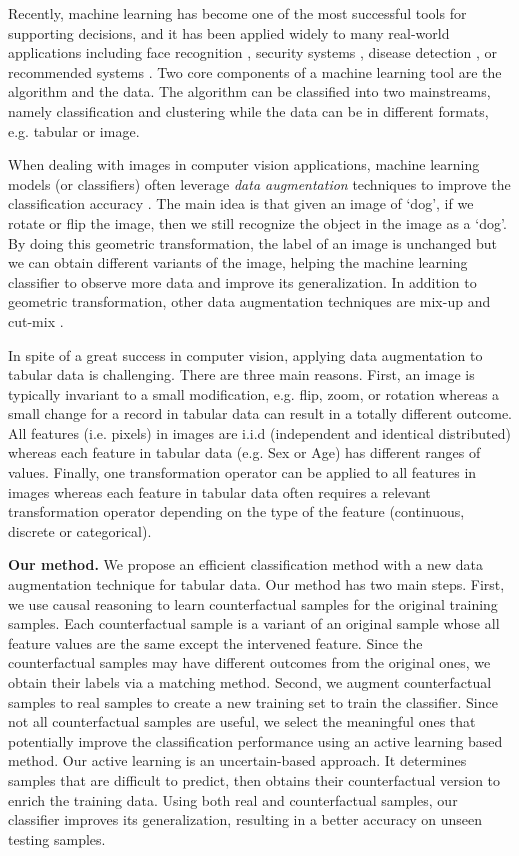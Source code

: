 Recently, machine learning has become one of the most successful tools
for supporting decisions, and it has been applied widely to many real-world
applications including face recognition \cite{sharif2016accessorize},
security systems \cite{apruzzese2019addressing}, disease detection
\cite{kumar2016dermatological}, or recommended systems \cite{portugal2018use}.
Two core components of a machine learning tool are the algorithm and
the data. The algorithm can be classified into two mainstreams, namely
classification and clustering while the data can be in different formats,
e.g. tabular or image.

When dealing with images in computer vision applications, machine
learning models (or classifiers) often leverage \textit{data augmentation}
techniques to improve the classification accuracy \cite{fawaz2018data}.
The main idea is that given an image of `dog', if we rotate or flip
the image, then we still recognize the object in the image as a `dog'.
By doing this geometric transformation, the label of an image is unchanged
but we can obtain different variants of the image, helping the machine
learning classifier to observe more data and improve its generalization.
In addition to geometric transformation, other data augmentation techniques
are mix-up \cite{zhang2017mixup} and cut-mix \cite{walawalkar2020attentive}.

In spite of a great success in computer vision, applying data augmentation
to tabular data is challenging. There are three main reasons. First,
an image is typically invariant to a small modification, e.g. flip,
zoom, or rotation whereas a small change for a record in tabular data
can result in a totally different outcome. All features (i.e. pixels)
in images are i.i.d (independent and identical distributed) whereas
each feature in tabular data (e.g. Sex or Age) has different ranges
of values. Finally, one transformation operator can be applied to
all features in images whereas each feature in tabular data often
requires a relevant transformation operator depending on the type
of the feature (continuous, discrete or categorical).

\textbf{Our method.} We propose an efficient classification method
with a new data augmentation technique for tabular data. Our method
has two main steps. First, we use causal reasoning to learn counterfactual
samples for the original training samples. Each counterfactual sample
is a variant of an original sample whose all feature values are the
same except the intervened feature. Since the counterfactual samples
may have different outcomes from the original ones, we obtain their
labels via a matching method. Second, we augment counterfactual samples
to real samples to create a new training set to train the classifier.
Since not all counterfactual samples are useful, we select the meaningful
ones that potentially improve the classification performance using
an active learning based method. Our active learning is an uncertain-based
approach. It determines samples that are difficult to predict, then
obtains their counterfactual version to enrich the training data.
Using both real and counterfactual samples, our classifier improves
its generalization, resulting in a better accuracy on unseen testing
samples.

